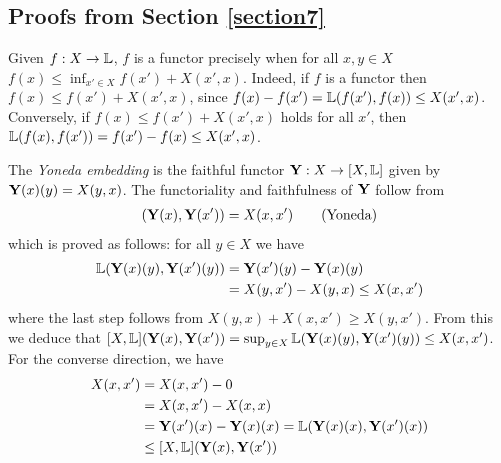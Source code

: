 %
\subsection{Proofs from Section \ref{section7}}

\begin{remark}\label{rem:functor}
Given $f:X\to \mathbb{L}$, $f$ is a functor precisely when for all $x,y\in X$ $f(x)\leq\inf_{x'\in X}f(x')+X(x',x)$. 
Indeed, if $f$ is a functor then $f(x)\leq f(x')+X(x',x)$, since $f(x)-f(x')=\mathbb{L}(f(x'),f(x))\leq X(x',x)$. 
Conversely, if $f(x)\leq f(x')+X(x',x)$ holds for all $x'$, then 
$\mathbb{L}(f(x),f(x'))=f(x')-f(x)\leq X(x',x)$. 
\end{remark}



\begin{remark}


The \emph{Yoneda embedding} is the faithful functor $\mathbf{Y}: X\to [X,\mathbb{L}]$ given by $\mathbf{Y}(x)(y)=X(y,x)$. The functoriality and faithfulness of $\mathbf{Y}$ follow from
\begin{align}
[X,\Lawv](\B Y(x),\B Y(x'))= X(x,x') \tag{Yoneda}
\end{align}
which is proved as follows: for all $y\in X$ we have 
\begin{align*}
\mathbb{L}( \mathbf{Y}(x)(y),\mathbf{Y}(x')(y))&= \mathbf{Y}(x')(y)-\mathbf{Y}(x)(y) \\
&= X(y,x')-X(y,x) \leq X(x,x')
\end{align*}
where the last step follows from $X(y,x)+X(x,x')\geq X(y,x')$. 
From this we deduce that $[X,\mathbb{L}](\mathbf{Y}(x),\mathbf{Y}(x'))=\sup_{y\in X}\mathbb{L}( \mathbf{Y}(x)(y),\mathbf{Y}(x')(y))\leq X(x,x')$. 
For the converse direction, we have  
\begin{align*}
X(x,x') &  = X(x,x') - 0 \\ &=
X(x,x')- X(x,x)
\\& =\mathbf{Y}(x')(x)-\mathbf{Y}(x)(x)= \mathbb{L}(\mathbf{Y}(x)(x),\mathbf{Y}(x')(x))\\
&\leq [X,\mathbb{L}](\mathbf{Y}(x), \mathbf{Y}(x'))
\end{align*}
\end{remark}



